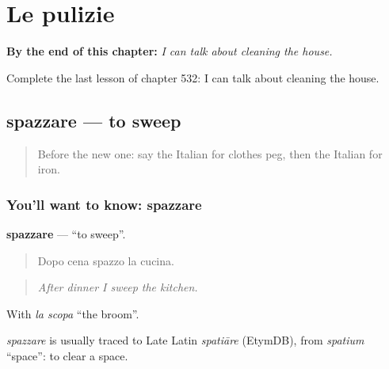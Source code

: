 
\chapter{Le pulizie}
\label{ch:it-le-pulizie}

\begin{chapteropening}
\textbf{By the end of this chapter:} \emph{I can talk about cleaning the house.}

Complete the last lesson of chapter 532: I can talk about cleaning the house.
\end{chapteropening}

\section[spazzare]{spazzare — to sweep}

\label{lesson:IT-C532-spazzare}



\begin{quote}
Before the new one: say the Italian for clothes peg, then the Italian for iron.
\end{quote}

\subsection*{You'll want to know: spazzare}
\textbf{spazzare} — \textquotedblleft{}to sweep\textquotedblright{}.

\begin{quote}
Dopo cena spazzo la cucina.
\end{quote}

\begin{quote}
\emph{After dinner I sweep the kitchen.}
\end{quote}

With \emph{la scopa} \textquotedblleft{}the broom\textquotedblright{}.

\begin{cousinweb}
\emph{spazzare} is usually traced to Late Latin \emph{spatiāre} (EtymDB), from \emph{spatium} \textquotedblleft{}space\textquotedblright{}: to clear a space.
\end{cousinweb}

